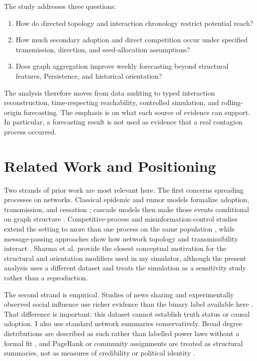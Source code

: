 \documentclass[11pt,a4paper]{article}
\begin{document}
The study addresses three questions:
\begin{enumerate}[label=\textbf{RQ\arabic*:},leftmargin=16mm]
\item How do directed topology and interaction chronology restrict potential reach?
\item How much secondary adoption and direct competition occur under specified transmission, direction, and seed-allocation assumptions?
\item Does graph aggregation improve weekly forecasting beyond structural features, Persistence, and historical orientation?
\end{enumerate}
The analysis therefore moves from data auditing to typed interaction reconstruction, time-respecting reachability, controlled simulation, and rolling-origin forecasting. The emphasis is on what each source of evidence can support. In particular, a forecasting result is not used as evidence that a real contagion process occurred.

\section{Related Work and Positioning}
Two strands of prior work are most relevant here. The first concerns spreading processes on networks. Classical epidemic and rumor models formalize adoption, transmission, and cessation \citep{kermack1927,daley1964}; cascade models then make those events conditional on graph structure \citep{kempe2003}. Competitive-process and misinformation-control studies extend the setting to more than one process on the same population \citep{shir2016,budak2011,lu2024}, while message-passing approaches show how network topology and transmissibility interact \citep{karrer2010}. Sharma et al. \citep{sharma2026} provide the closest conceptual motivation for the structural and orientation modifiers used in my simulator, although the present analysis uses a different dataset and treats the simulation as a sensitivity study rather than a reproduction.

The second strand is empirical. Studies of news sharing and experimentally observed social influence use richer evidence than the binary label available here \citep{vosoughi2018,centola2010}. That difference is important: this dataset cannot establish truth status or causal adoption. I also use standard network summaries conservatively. Broad degree distributions are described as such rather than labelled power laws without a formal fit \citep{clauset2009}, and PageRank or community assignments are treated as structural summaries, not as measures of credibility or political identity \citep{brin1998,traag2019}.
\end{document}
